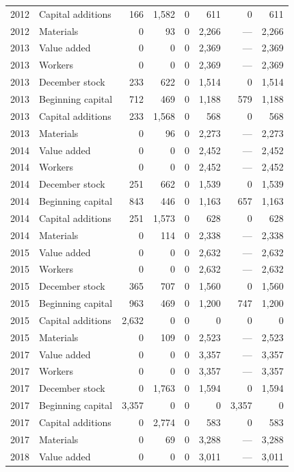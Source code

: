 \begin{longtable}{llrrrrrr}
2012 & Capital additions & 166 & 1,582 & 0 & 611 & 0 & 611 \\
2012 & Materials & 0 & 93 & 0 & 2,266 & --- & 2,266 \\
2013 & Value added & 0 & 0 & 0 & 2,369 & --- & 2,369 \\
2013 & Workers & 0 & 0 & 0 & 2,369 & --- & 2,369 \\
2013 & December stock & 233 & 622 & 0 & 1,514 & 0 & 1,514 \\
2013 & Beginning capital & 712 & 469 & 0 & 1,188 & 579 & 1,188 \\
2013 & Capital additions & 233 & 1,568 & 0 & 568 & 0 & 568 \\
2013 & Materials & 0 & 96 & 0 & 2,273 & --- & 2,273 \\
2014 & Value added & 0 & 0 & 0 & 2,452 & --- & 2,452 \\
2014 & Workers & 0 & 0 & 0 & 2,452 & --- & 2,452 \\
2014 & December stock & 251 & 662 & 0 & 1,539 & 0 & 1,539 \\
2014 & Beginning capital & 843 & 446 & 0 & 1,163 & 657 & 1,163 \\
2014 & Capital additions & 251 & 1,573 & 0 & 628 & 0 & 628 \\
2014 & Materials & 0 & 114 & 0 & 2,338 & --- & 2,338 \\
2015 & Value added & 0 & 0 & 0 & 2,632 & --- & 2,632 \\
2015 & Workers & 0 & 0 & 0 & 2,632 & --- & 2,632 \\
2015 & December stock & 365 & 707 & 0 & 1,560 & 0 & 1,560 \\
2015 & Beginning capital & 963 & 469 & 0 & 1,200 & 747 & 1,200 \\
2015 & Capital additions & 2,632 & 0 & 0 & 0 & 0 & 0 \\
2015 & Materials & 0 & 109 & 0 & 2,523 & --- & 2,523 \\
2017 & Value added & 0 & 0 & 0 & 3,357 & --- & 3,357 \\
2017 & Workers & 0 & 0 & 0 & 3,357 & --- & 3,357 \\
2017 & December stock & 0 & 1,763 & 0 & 1,594 & 0 & 1,594 \\
2017 & Beginning capital & 3,357 & 0 & 0 & 0 & 3,357 & 0 \\
2017 & Capital additions & 0 & 2,774 & 0 & 583 & 0 & 583 \\
2017 & Materials & 0 & 69 & 0 & 3,288 & --- & 3,288 \\
2018 & Value added & 0 & 0 & 0 & 3,011 & --- & 3,011 \\

\end{longtable}

